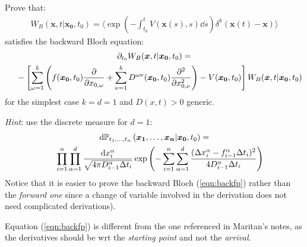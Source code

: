 \documentclass[../template.tex]{subfiles}
\begin{document}
\begin{exo}
    Prove that:
    \begin{align*}
        W_B(\bm{x},t|\bm{x_0},t_0) = \langle \exp\left(-\int_{t_0}^t V(\bm{x}(s),s) \dd{s}\right) \delta^k(\bm{x}(t)-\bm{x})\rangle
    \end{align*}
    satisfies the backward Bloch equation:
    \begin{align} \label{eqn:backfp} 
        \partial_{t_0} W_B(\bm{x},t|\bm{x_0},t_0) =\span\\ \nonumber
        &\quad \> -\left[\sum_{\omega=1}^k \left(f(\bm{x_0},t_0) \pdv{x_{0,\omega}} + \sum_{\nu=1}^k D^{\omega \nu}(\bm{x_0},t_0)\pdv[2]{x_{0,\nu}}\right) - V(\bm{x_0},t_0)\right] W_B(\bm{x},t|\bm{x_0},t_0)
    \end{align}
    for the simplest case $k=d=1$ and $D(x,t) > 0$ generic.
    
    \medskip

    \textit{Hint}: use the discrete measure for $d=1$:
    \begin{align} \label{eqn:discr}
        \dd{\mathbb{P}}_{t_1,\dots,t_n}(\bm{x_1},\dots,\bm{x_n}|\bm{x_0},t_0) = \span\\ \nonumber
        &\quad \> \prod_{i=1}^n \prod_{\alpha = 1}^d \frac{\dd{x_i^\alpha}}{\sqrt{4 \pi D^\alpha_{i-1} \Delta t_i}} \exp\left(-\sum_{i=1}^n \sum_{\alpha=1}^d \frac{(\Delta x_i^\alpha - f^\alpha_{i-1}\Delta t_i)^2}{4 D^\alpha_{i-1} \Delta t_i} \right) 
    \end{align}
    Notice that it is easier to prove the backward Bloch (\ref{eqn:backfp}) rather than the \textit{forward one}  since a change of variable involved in the derivation does not need complicated derivations).

    \begin{expl}
        Equation (\ref{eqn:backfp}) is different from the one referenced in Maritan's notes, as the derivatives should be wrt the \textit{starting point} and not the \textit{arrival}.  
    \end{expl}
    \medskip




\end{exo}
\end{document}
